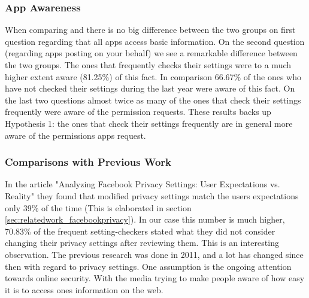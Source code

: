\subsubsection{App Awareness}
When comparing  and  there is no big difference between the two groups on first question regarding that all apps access basic information. On the second question (regarding apps posting on your behalf) we see a remarkable difference between the two groups. The ones that frequently checks their settings were to a much higher extent aware (81.25\%) of this fact. In comparison 66.67\% of the ones who have not checked their settings during the last year were aware of this fact. On the last two questions almost twice as many of the ones that check their settings frequently were aware of the permission requests. These results backs up Hypothesis 1: the ones that check their settings frequently are in general more aware of the permissions apps request.

\subsubsection{Comparisons with Previous Work} 
In the article "Analyzing Facebook Privacy Settings: User Expectations vs. Reality" \cite{expectations} they found that modified privacy settings match the users expectations only 39\% of the time (This is elaborated in section \ref{sec:relatedwork_facebookprivacy}). In our case this number is much higher, 70.83\% of the frequent setting-checkers stated what they did not consider changing their privacy settings after reviewing them. This is an interesting observation. The previous research was done in 2011, and a lot has changed since then with regard to privacy settings. One assumption is the ongoing attention towards online security. With the media trying to make people aware of how easy it is to access ones information on the web. 

